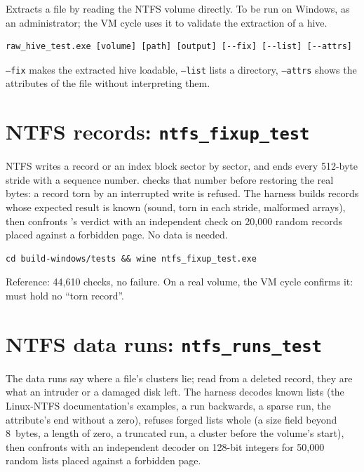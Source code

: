 \documentclass[11pt,a4paper,oneside]{report}
\begin{document}
Extracts a file by reading the NTFS volume directly. To be run on Windows, as an
administrator; the VM cycle uses it to validate the extraction of a hive.

\begin{lstlisting}
raw_hive_test.exe [volume] [path] [output] [--fix] [--list] [--attrs]
\end{lstlisting}

\texttt{--fix} makes the extracted hive loadable, \texttt{--list} lists a
directory, \texttt{--attrs} shows the  attributes of the file
without interpreting them.

\section{NTFS records: \texttt{ntfs\_fixup\_test}}

NTFS writes a  record or an index block sector by sector,
and ends every 512-byte stride with a sequence number. \wac{} checks that
number before restoring the real bytes: a record torn by an interrupted write
is refused. The harness builds records whose expected result is known (sound,
torn in each stride, malformed arrays), then confronts \wac{}'s verdict with an
independent check on 20,000 random records placed against a forbidden page.
No data is needed.

\begin{lstlisting}
cd build-windows/tests && wine ntfs_fixup_test.exe
\end{lstlisting}

Reference: 44,610 checks, no failure. On a real volume, the VM cycle confirms
it:  must hold no ``torn record''.

\section{NTFS data runs: \texttt{ntfs\_runs\_test}}

The data runs say where a file's clusters lie; read from a deleted record,
they are what an intruder or a damaged disk left. The harness decodes known
lists (the Linux-NTFS documentation's examples, a run backwards, a sparse run,
the attribute's end without a zero), refuses forged lists whole (a size field
beyond 8~bytes, a length of zero, a truncated run, a cluster before the
volume's start), then confronts \wac{} with an independent decoder on 128-bit
integers for 50,000 random lists placed against a forbidden page.
\end{document}
